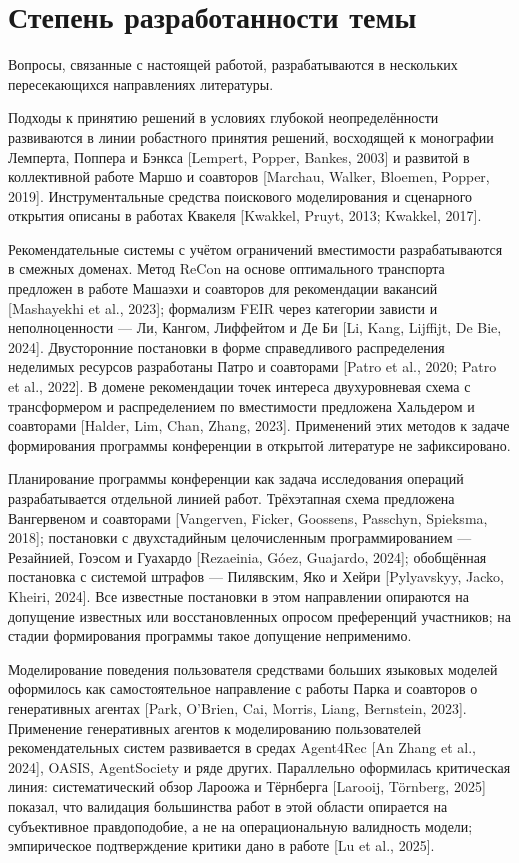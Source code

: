\section*{Степень разработанности темы}

Вопросы, связанные с настоящей работой, разрабатываются в нескольких пересекающихся направлениях литературы.

Подходы к принятию решений в условиях глубокой неопределённости развиваются в линии робастного принятия решений, восходящей к монографии Лемперта, Поппера и Бэнкса [Lempert, Popper, Bankes, 2003] и развитой в коллективной работе Маршо и соавторов [Marchau, Walker, Bloemen, Popper, 2019]. Инструментальные средства поискового моделирования и сценарного открытия описаны в работах Квакеля [Kwakkel, Pruyt, 2013; Kwakkel, 2017].

Рекомендательные системы с учётом ограничений вместимости разрабатываются в смежных доменах. Метод ReCon на основе оптимального транспорта предложен в работе Машаэхи и соавторов для рекомендации вакансий [Mashayekhi et al., 2023]; формализм FEIR через категории зависти и неполноценности — Ли, Кангом, Лиффейтом и Де Би [Li, Kang, Lijffijt, De Bie, 2024]. Двусторонние постановки в форме справедливого распределения неделимых ресурсов разработаны Патро и соавторами [Patro et al., 2020; Patro et al., 2022]. В домене рекомендации точек интереса двухуровневая схема с трансформером и распределением по вместимости предложена Хальдером и соавторами [Halder, Lim, Chan, Zhang, 2023]. Применений этих методов к задаче формирования программы конференции в открытой литературе не зафиксировано.

Планирование программы конференции как задача исследования операций разрабатывается отдельной линией работ. Трёхэтапная схема предложена Вангервеном и соавторами [Vangerven, Ficker, Goossens, Passchyn, Spieksma, 2018]; постановки с двухстадийным целочисленным программированием — Резайнией, Гоэсом и Гуахардо [Rezaeinia, Góez, Guajardo, 2024]; обобщённая постановка с системой штрафов — Пилявским, Яко и Хейри [Pylyavskyy, Jacko, Kheiri, 2024]. Все известные постановки в этом направлении опираются на допущение известных или восстановленных опросом преференций участников; на стадии формирования программы такое допущение неприменимо.

Моделирование поведения пользователя средствами больших языковых моделей оформилось как самостоятельное направление с работы Парка и соавторов о генеративных агентах [Park, O'Brien, Cai, Morris, Liang, Bernstein, 2023]. Применение генеративных агентов к моделированию пользователей рекомендательных систем развивается в средах Agent4Rec [An Zhang et al., 2024], OASIS, AgentSociety и ряде других. Параллельно оформилась критическая линия: систематический обзор Лароожа и Тёрнберга [Larooij, Törnberg, 2025] показал, что валидация большинства работ в этой области опирается на субъективное правдоподобие, а не на операциональную валидность модели; эмпирическое подтверждение критики дано в работе [Lu et al., 2025].

